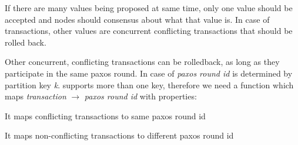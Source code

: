 
If there are many values being proposed at same time, only one value should be accepted and nodes should consensus about what that value is. In case of transactions, other values are concurrent conflicting transactions that should be rolled back.

Other concurrent, conflicting transactions can be rolledback, as long as they participate in the same paxos round. In case of \lwt \emph{paxos round id} is determined by partition key \emph{k}. \mpp supports more than one key, therefore we need a function which maps \emph{transaction} $\rightarrow $ \emph{paxos round id} with properties: 
\begin{enumerate*}
\item It maps conflicting transactions to same paxos round id 
\item It maps non-conflicting transactions to different paxos round id
\end{enumerate*}